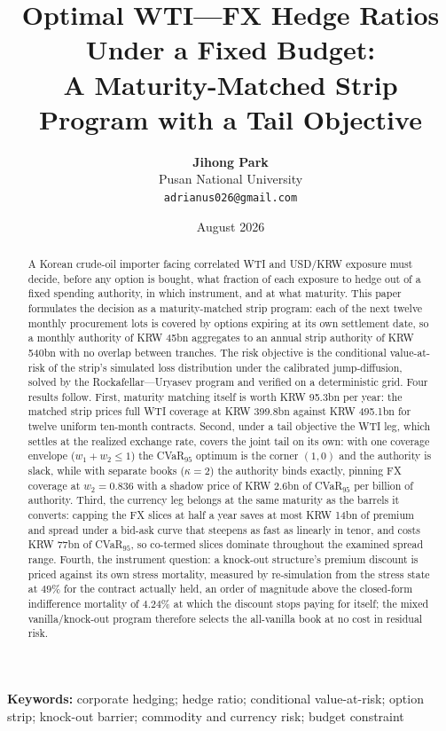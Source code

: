 \documentclass[11pt,a4paper]{article}
\title{\textbf{Optimal WTI---FX Hedge Ratios Under a Fixed Budget:\\ A Maturity-Matched Strip Program with a Tail Objective}}
\author{\textbf{Jihong Park} \\ Pusan National University \\ \texttt{adrianus026@gmail.com}}
\date{August 2026}
\begin{document}
\maketitle

\begin{abstract}
A Korean crude-oil importer facing correlated WTI and USD/KRW exposure must decide, before any option is bought, what fraction of each exposure to hedge out of a fixed spending authority, in which instrument, and at what maturity. This paper formulates the decision as a maturity-matched strip program: each of the next twelve monthly procurement lots is covered by options expiring at its own settlement date, so a monthly authority of KRW 45bn aggregates to an annual strip authority of KRW 540bn with no overlap between tranches. The risk objective is the conditional value-at-risk of the strip's simulated loss distribution under the calibrated jump-diffusion, solved by the Rockafellar---Uryasev program and verified on a deterministic grid. Four results follow. First, maturity matching itself is worth KRW 95.3bn per year: the matched strip prices full WTI coverage at KRW 399.8bn against KRW 495.1bn for twelve uniform ten-month contracts. Second, under a tail objective the WTI leg, which settles at the realized exchange rate, covers the joint tail on its own: with one coverage envelope ($w_1+w_2\le1$) the CVaR$_{95}$ optimum is the corner $(1,0)$ and the authority is slack, while with separate books ($\kappa=2$) the authority binds exactly, pinning FX coverage at $w_2=0.836$ with a shadow price of KRW 2.6bn of CVaR$_{95}$ per billion of authority. Third, the currency leg belongs at the same maturity as the barrels it converts: capping the FX slices at half a year saves at most KRW 14bn of premium and spread under a bid-ask curve that steepens as fast as linearly in tenor, and costs KRW 77bn of CVaR$_{95}$, so co-termed slices dominate throughout the examined spread range. Fourth, the instrument question: a knock-out structure's premium discount is priced against its own stress mortality, measured by re-simulation from the stress state at $49\%$ for the contract actually held, an order of magnitude above the closed-form indifference mortality of $4.24\%$ at which the discount stops paying for itself; the mixed vanilla/knock-out program therefore selects the all-vanilla book at no cost in residual risk.
\end{abstract}

\vspace{0.5em}
\noindent\textbf{Keywords:} corporate hedging; hedge ratio; conditional value-at-risk; option strip; knock-out barrier; commodity and currency risk; budget constraint
\end{document}
